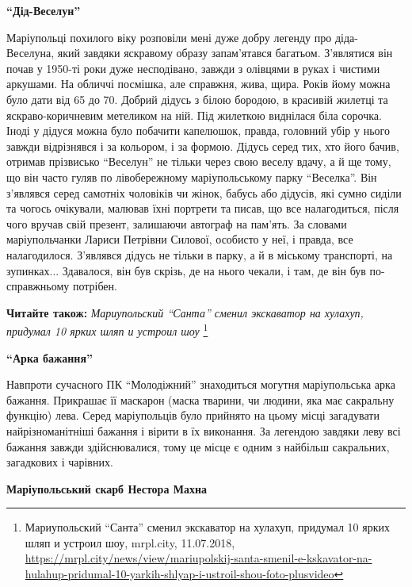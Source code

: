 \begin{center}
\bfseries\enquote{Дід-Веселун}
\end{center}

Маріупольці похилого віку розповіли мені дуже добру легенду про діда-Веселуна,
який завдяки яскравому образу запам'ятався багатьом. З'являтися він почав у
1950-ті роки дуже несподівано, завжди з олівцями в руках і чистими аркушами. На
обличчі посмішка, але справжня, жива, щира. Років йому можна було дати від 65
до 70. Добрий дідусь з білою бородою, в красивій жилетці та яскраво-коричневим
метеликом на ній. Під жилеткою виднілася біла сорочка. Іноді у дідуся можна
було побачити капелюшок, правда, головний убір у нього завжди відрізнявся і за
кольором, і за формою. Дідусь серед тих, хто його бачив, отримав прізвисько
\enquote{Веселун} не тільки через свою веселу вдачу, а й ще тому, що він часто гуляв по
лівобережному маріупольському парку \enquote{Веселка}. Він з'являвся серед самотніх
чоловіків чи жінок, бабусь або дідусів, які сумно сиділи та чогось очікували,
малював їхні портрети та писав, що все налагодиться, після чого вручав свій
презент, залишаючи автограф на пам'ять. За словами маріупольчанки Лариси
Петрівни Силової, особисто у неї, і правда, все налагодилося. З'являвся дідусь
не тільки в парку, а й в міському транспорті, на зупинках... Здавалося, він був
скрізь, де на нього чекали, і там, де він був по-справжньому потрібен.

\textbf{Читайте також:} \emph{Мариупольский \enquote{Санта} сменил экскаватор на хулахуп, придумал 10 ярких шляп и устроил шоу}%
\footnote{Мариупольский \enquote{Санта} сменил экскаватор на хулахуп, придумал 10 ярких шляп и устроил шоу, mrpl.city, 11.07.2018, \url{https://mrpl.city/news/view/mariupolskij-santa-smenil-e-kskavator-na-hulahup-pridumal-10-yarkih-shlyap-i-ustroil-shou-foto-plusvideo}}

\begin{center}
\bfseries\enquote{Арка бажання}
\end{center}

Навпроти сучасного ПК \enquote{Молодіжний} знаходиться могутня маріупольська арка
бажання. Прикрашає її маскарон (маска тварини, чи людини, яка має сакральну
функцію) лева. Серед маріупольців було прийнято на цьому місці загадувати
найрізноманітніші бажання і вірити в їх виконання. За легендою завдяки леву всі
бажання завжди здійснювалися, тому це місце є одним з найбільш сакральних,
загадкових і чарівних.

\begin{center}
\textbf{Маріупольський скарб Нестора Махна}
\end{center}

